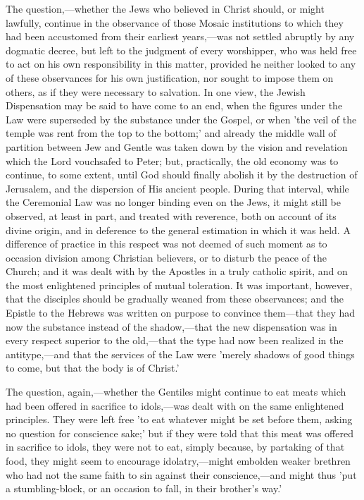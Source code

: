 \documentclass[
]{book}
\begin{document}
The question,---whether the Jews who believed in Christ should, or might lawfully, continue in the observance of those Mosaic institutions to which they had been accustomed from their earliest years,---was not settled abruptly by any dogmatic decree, but left to the judgment of every worshipper, who was held free to act on his own responsibility in this matter, provided he neither looked to any of these observances for his own justification, nor sought to impose them on others, as if they were necessary to salvation. In one view, the Jewish Dispensation may be said to have come to an end, when the figures under the Law were superseded by the substance under the Gospel, or when 'the veil of the temple was rent from the top to the bottom;' and already the middle wall of partition between Jew and Gentle was taken down by the vision and revelation which the Lord vouchsafed to Peter; but, practically, the old economy was to continue, to some extent, until God should finally abolish it by the destruction of Jerusalem, and the dispersion of His ancient people. During that interval, while the Ceremonial Law was no longer binding even on the Jews, it might still be observed, at least in part, and treated with reverence, both on account of its divine origin, and in deference to the general estimation in which it was held. A difference of practice in this respect was not deemed of such moment as to occasion division among Christian believers, or to disturb the peace of the Church; and it was dealt with by the Apostles in a truly catholic spirit, and on the most enlightened principles of mutual toleration. It was important, however, that the disciples should be gradually weaned from these observances; and the Epistle to the Hebrews was written on purpose to convince them---that they had now the substance instead of the shadow,---that the new dispensation was in every respect superior to the old,---that the type had now been realized in the antitype,---and that the services of the Law were 'merely shadows of good things to come, but that the body is of Christ.'

The question, again,---whether the Gentiles might continue to eat meats which had been offered in sacrifice to idols,---was dealt with on the same enlightened principles. They were left free 'to eat whatever might be set before them, asking no question for conscience sake;' but if they were told that this meat was offered in sacrifice to idols, they were not to eat, simply because, by partaking of that food, they might seem to encourage idolatry,---might embolden weaker brethren who had not the same faith to sin against their conscience,---and might thus 'put a stumbling-block, or an occasion to fall, in their brother's way.'
\end{document}
